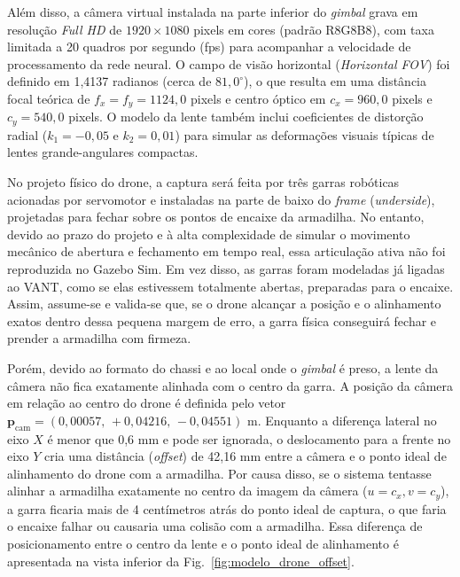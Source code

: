 Além disso, a câmera virtual instalada na parte inferior do \textit{gimbal} grava em resolução \textit{Full HD} de $1920 \times 1080$ pixels em cores (padrão R8G8B8), com taxa limitada a 20 quadros por segundo (fps) para acompanhar a velocidade de processamento da rede neural. O campo de visão horizontal (\textit{Horizontal FOV}) foi definido em 1,4137 radianos (cerca de $81{,}0^\circ$), o que resulta em uma distância focal teórica de $f_x = f_y = 1124{,}0$ pixels e centro óptico em $c_x = 960{,}0$ pixels e $c_y = 540{,}0$ pixels. O modelo da lente também inclui coeficientes de distorção radial ($k_1 = -0{,}05$ e $k_2 = 0{,}01$) para simular as deformações visuais típicas de lentes grande-angulares compactas.

No projeto físico do drone, a captura será feita por três garras robóticas acionadas por servomotor e instaladas na parte de baixo do \textit{frame} (\textit{underside}), projetadas para fechar sobre os pontos de encaixe da armadilha. No entanto, devido ao prazo do projeto e à alta complexidade de simular o movimento mecânico de abertura e fechamento em tempo real, essa articulação ativa não foi reproduzida no Gazebo Sim. Em vez disso, as garras foram modeladas já ligadas ao VANT, como se elas estivessem totalmente abertas, preparadas para o encaixe. Assim, assume-se e valida-se que, se o drone alcançar a posição e o alinhamento exatos dentro dessa pequena margem de erro, a garra física conseguirá fechar e prender a armadilha com firmeza.

Porém, devido ao formato do chassi e ao local onde o \textit{gimbal} é preso, a lente da câmera não fica exatamente alinhada com o centro da garra. A posição da câmera em relação ao centro do drone é definida pelo vetor $\mathbf{p}_{\text{cam}} = (0{,}00057,\, +0{,}04216,\, -0{,}04551)\text{ m}$. Enquanto a diferença lateral no eixo $X$ é menor que 0,6 mm e pode ser ignorada, o deslocamento para a frente no eixo $Y$ cria uma distância (\textit{offset}) de 42,16 mm entre a câmera e o ponto ideal de alinhamento do drone com a armadilha. Por causa disso, se o sistema tentasse alinhar a armadilha exatamente no centro da imagem da câmera ($u = c_x, v = c_y$), a garra ficaria mais de 4 centímetros atrás do ponto ideal de captura, o que faria o encaixe falhar ou causaria uma colisão com a armadilha. Essa diferença de posicionamento entre o centro da lente e o ponto ideal de alinhamento é apresentada na vista inferior da Fig.~\ref{fig:modelo_drone_offset}.

